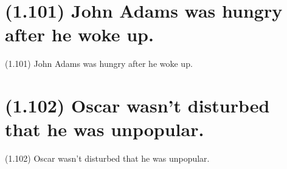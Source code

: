 \documentclass{article}
\begin{document}
\clearpage

%
%

\section*{(1.101) John Adams was hungry after he woke up.}

\bigbreak
\begin{enumerate*}
\item[(1.101)] John Adams was hungry after he woke up.
\end{enumerate*}
\bigbreak

\bigbreak
\begin{minipage}{\textwidth}
\end{minipage}
\bigbreak

\clearpage

%
%

\section*{(1.102) Oscar wasn't disturbed that he was unpopular.}

\bigbreak
\begin{enumerate*}
\item[(1.102)] Oscar wasn't disturbed that he was unpopular.
\end{enumerate*}
\bigbreak

\bigbreak
\begin{minipage}{\textwidth}
\end{minipage}
\bigbreak
\end{document}
